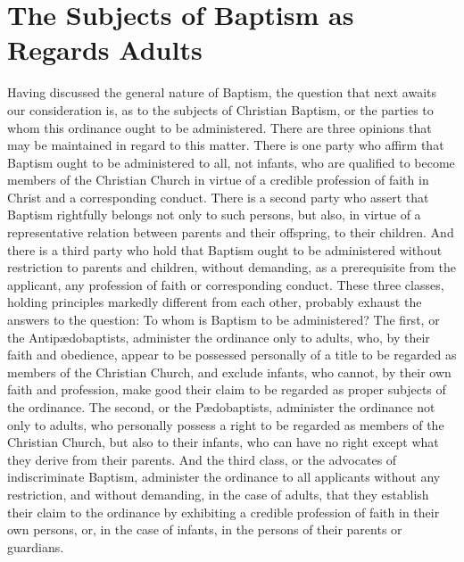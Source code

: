\documentclass[
]{book}
\begin{document}
\hypertarget{the-subjects-of-baptism-as-regards-adults}{%
\section{The Subjects of Baptism as Regards Adults}\label{the-subjects-of-baptism-as-regards-adults}}

Having discussed the general nature of Baptism, the question that next awaits our consideration is, as to the subjects of Christian Baptism, or the parties to whom this ordinance ought to be administered. There are three opinions that may be maintained in regard to this matter. There is one party who affirm that Baptism ought to be administered to all, not infants, who are qualified to become members of the Christian Church in virtue of a credible profession of faith in Christ and a corresponding conduct. There is a second party who assert that Baptism rightfully belongs not only to such persons, but also, in virtue of a representative relation between parents and their offspring, to their children. And there is a third party who hold that Baptism ought to be administered without restriction to parents and children, without demanding, as a prerequisite from the applicant, any profession of faith or corresponding conduct. These three classes, holding principles markedly different from each other, probably exhaust the answers to the question: To whom is Baptism to be administered? The first, or the Antipædobaptists, administer the ordinance only to adults, who, by their faith and obedience, appear to be possessed personally of a title to be regarded as members of the Christian Church, and exclude infants, who cannot, by their own faith and profession, make good their claim to be regarded as proper subjects of the ordinance. The second, or the Pædobaptists, administer the ordinance not only to adults, who personally possess a right to be regarded as members of the Christian Church, but also to their infants, who can have no right except what they derive from their parents. And the third class, or the advocates of indiscriminate Baptism, administer the ordinance to all applicants without any restriction, and without demanding, in the case of adults, that they establish their claim to the ordinance by exhibiting a credible profession of faith in their own persons, or, in the case of infants, in the persons of their parents or guardians.
\end{document}
